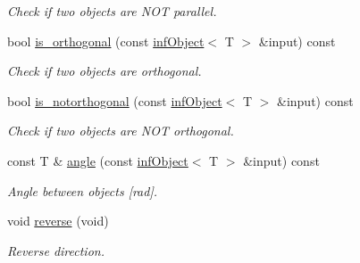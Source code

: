 \begin{DoxyCompactItemize}
\begin{DoxyCompactList}\small\item\em Check if two objects are N\+OT parallel. \end{DoxyCompactList}\item 
bool \hyperlink{classddd_1_1inf_object_aca80af28af48b48a58c237dbebd889d0}{is\+\_\+orthogonal} (const \hyperlink{classddd_1_1inf_object}{inf\+Object}$<$ T $>$ \&input) const
\begin{DoxyCompactList}\small\item\em Check if two objects are orthogonal. \end{DoxyCompactList}\item 
bool \hyperlink{classddd_1_1inf_object_afb3d69d65ae6b664796a153c7c78c2bd}{is\+\_\+notorthogonal} (const \hyperlink{classddd_1_1inf_object}{inf\+Object}$<$ T $>$ \&input) const
\begin{DoxyCompactList}\small\item\em Check if two objects are N\+OT orthogonal. \end{DoxyCompactList}\item 
const T \& \hyperlink{classddd_1_1inf_object_af788c09aac2cec319223d83db66b9a05}{angle} (const \hyperlink{classddd_1_1inf_object}{inf\+Object}$<$ T $>$ \&input) const
\begin{DoxyCompactList}\small\item\em Angle between objects \mbox{[}rad\mbox{]}. \end{DoxyCompactList}\item 
\mbox{\label{classddd_1_1inf_object_a1aac0cd1bc62423685308fbe04d4a63d}} 
void \hyperlink{classddd_1_1inf_object_a1aac0cd1bc62423685308fbe04d4a63d}{reverse} (void)
\begin{DoxyCompactList}\small\item\em Reverse direction. \end{DoxyCompactList}\end{DoxyCompactItemize}
